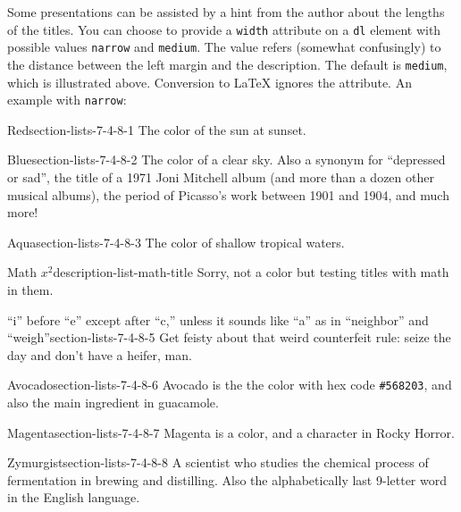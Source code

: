 \documentclass{amsart}
\theoremstyle{plain}%
\theoremstyle{definition}%
\theoremstyle{remark}%
\newcommand{\mono}[1]{\texttt{#1}}
\numberwithin{equation}{section}
\begin{document}
%
\par
Some presentations can be assisted by a hint from the author about the lengths of the titles.  You can choose to provide a \mono{width} attribute on a \mono{dl} element with possible values \mono{narrow} and \mono{medium}. The value refers (somewhat confusingly) to the distance between the left margin and the description.  The default is \mono{medium}, which is illustrated above. Conversion to \LaTeX{} ignores the attribute.  An example with \mono{narrow}:%
\begin{descriptionlist}
\begin{dlinarrow}{Red}{section-lists-7-4-8-1}%
The color of the sun at sunset.%
\end{dlinarrow}%
\begin{dlinarrow}{Blue}{section-lists-7-4-8-2}%
The color of a clear sky. Also a synonym for ``depressed or sad'', the title of a 1971 Joni Mitchell album (and more than a dozen other musical albums), the period of Picasso's work between 1901 and 1904, and much more!%
\end{dlinarrow}%
\begin{dlinarrow}{Aqua}{section-lists-7-4-8-3}%
The color of shallow tropical waters.\footnotemark{}%
\end{dlinarrow}%
%
\begin{dlinarrow}{Math \(x^2\)}{description-list-math-title}%
Sorry, not a color but testing titles with math in them.%
\end{dlinarrow}%
\begin{dlinarrow}{``i'' before ``e'' except after ``c,'' unless it sounds like ``a'' as in ``neighbor'' and ``weigh''}{section-lists-7-4-8-5}%
Get feisty about that weird counterfeit rule: seize the day and don't have a heifer, man.%
\end{dlinarrow}%
\begin{dlinarrow}{Avocado}{section-lists-7-4-8-6}%
Avocado is the the color with hex code \mono{\#568203}, and also the main ingredient in guacamole.%
\end{dlinarrow}%
\begin{dlinarrow}{Magenta}{section-lists-7-4-8-7}%
Magenta is a color, and a character in Rocky Horror.%
\end{dlinarrow}%
\begin{dlinarrow}{Zymurgist}{section-lists-7-4-8-8}%
A scientist who studies the chemical process of fermentation in brewing and distilling.  Also the alphabetically last 9-letter word in the English language.%

\end{dlinarrow}
\end{descriptionlist}
\end{document}
